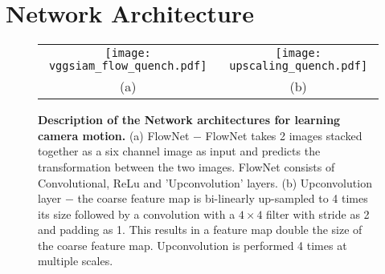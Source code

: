 \documentclass[usletter, 10 pt, conference]{ieeeconf}  %
\begin{document}
\section{Network Architecture}
\begin{figure*}[t!]
\begin{center}
\begin{tabular}{cc}
\texttt{[image: vggsiam\_flow\_quench.pdf]} &
\texttt{[image: upscaling\_quench.pdf]} \\
(a) & (b) \\
\end{tabular}
\end{center}
\caption{\textbf{Description of the Network architectures for learning camera motion.} (a) FlowNet $-$ FlowNet takes 2 images stacked together as a six channel image as input and predicts the transformation between the two images. FlowNet consists of Convolutional, ReLu and 'Upconvolution' layers. (b) Upconvolution layer $-$ the coarse feature map is bi-linearly up-sampled to 4 times its size followed by a convolution with a $4 \times 4$ filter with stride as 2 and padding as 1. This results in a feature map double the size of the coarse feature map. Upconvolution is performed 4 times at multiple scales.  }
\label{fig:exp1}
\vspace{-0.5em}
\end{figure*}
\end{document}
